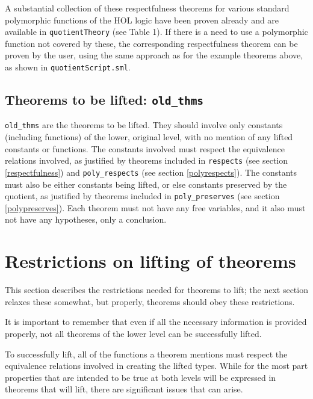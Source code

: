 \documentclass[envcountsame,runningheads]{llncs}
\begin{document}
A substantial collection of these respectfulness theorems for various
standard polymorphic functions of the HOL logic have been proven already and
are available in {\tt quotientTheory} (see Table 1).
If there is a need to use a
polymorphic function not covered by these, the corresponding respectfulness
theorem can be proven by the user, using the same approach as for the example
theorems above, as shown in {\tt quotientScript.sml}.


%
\subsection{Theorems to be lifted: {\tt old\_thms}}
%
\label{oldtheorem}

{\tt old\_thms} are the theorems to be lifted.  They should involve only
constants (including functions) of the lower, original level,
with no mention of any lifted constants or functions. 
The constants involved must respect
the equivalence relations involved,
as justified by theorems included
in {\tt respects} (see section \ref{respectfulness})
and {\tt poly\_respects} (see section \ref{polyrespects}).
The constants must also be either constants being lifted, or else constants
preserved by the quotient, as justified by theorems included in
{\tt poly\_preserves} (see section \ref{polypreserves}).
Each theorem must not have any free variables, and it also must not
have any hypotheses, only a conclusion.



%
\section{Restrictions on lifting of theorems}
%
\label{restrictions}

This section describes the restrictions needed for theorems to lift;
the next section relaxes these somewhat, but
properly, theorems should obey these restrictions.

It is important to remember that even if all the necessary information
is provided properly, not all theorems of the lower level 
can be successfully lifted.

To successfully lift, all of the functions a theorem mentions must
respect the equivalence relations involved in creating the lifted types.
While for the most part properties that are intended to be true at
both levels will be expressed in theorems that will lift, there are
significant issues that can arise.
\end{document}
